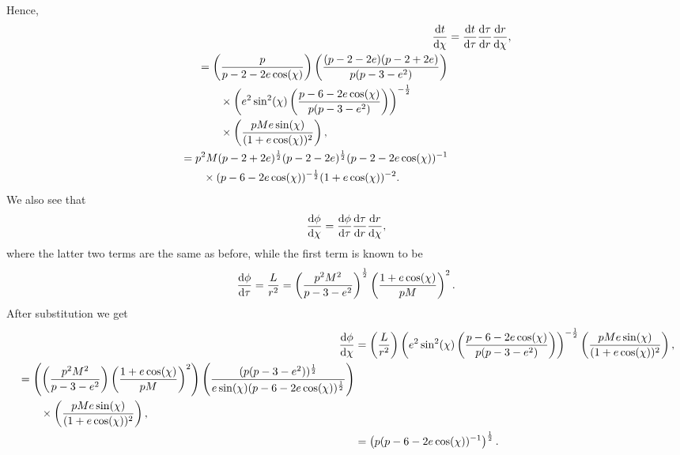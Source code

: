 Hence,
\begin{align}
\dv{t}{\chi}&=\dv{t}{\tau}\dv{\tau}{r}\dv{r}{\chi},\\
\begin{split}
&=\left(\frac{p}{p-2-2e\cos(\chi)} \right)\left(\frac{(p-2-2e)(p-2+2e)}{p(p-3-e^2)}\right)\\
&\qquad\times\left(e^2\sin^2(\chi)\left(\frac{p-6-2e\cos(\chi)}{p(p-3-e^2)} \right)\right)^{-\frac{1}{2}}\\
&\qquad\times\left(\frac{pMe\sin(\chi)}{(1+e\cos(\chi))^2} \right),
\end{split}\\
\begin{split}
&=p^2M(p-2+2e)^{\frac{1}{2}}(p-2-2e)^{\frac{1}{2}}(p-2-2e\cos(\chi))^{-1}\\
&\qquad\times(p-6-2e\cos(\chi))^{-\frac{1}{2}}(1+e\cos(\chi))^{-2}.
\end{split}
\end{align}
We also see that 
\begin{equation}
\dv{\phi}{\chi}=\dv{\phi}{\tau}\dv{\tau}{r}\dv{r}{\chi},
\end{equation}
where the latter two terms are the same as before, while the first term is known to be
\begin{equation}
\dv{\phi}{\tau}=\frac{L}{r^2}=\left(\frac{p^2M^2}{p-3-e^2} \right)^{\frac{1}{2}}\left(\frac{1+e\cos(\chi)}{pM} \right)^2.
\end{equation}
After substitution we get
\begin{align}
    \dv{\phi}{\chi}&=\left(\frac{L}{r^2}\right)\left(e^2\sin^2(\chi)\left(\frac{p-6-2e\cos(\chi)}{p(p-3-e^2)}\right)\right)^{-\frac{1}{2}}\left(\frac{pMe\sin(\chi)}{(1+e\cos(\chi))^2} \right),\\
    \begin{split}
    &=\left(\left(\frac{p^2M^2}{p-3-e^2} \right)\left(\frac{1+e\cos(\chi)}{pM} \right)^2\right)\left(\frac{(p(p-3-e^2))^{\frac{1}{2}}}{e\sin(\chi)(p-6-2e\cos(\chi))^{\frac{1}{2}}} \right)\\
    &\qquad\times\left(\frac{pMe\sin(\chi)}{(1+e\cos(\chi))^2} \right),
    \end{split}\\
    &=\left(p(p-6-2e\cos(\chi))^{-1}\right)^{\frac{1}{2}}.
\end{align}